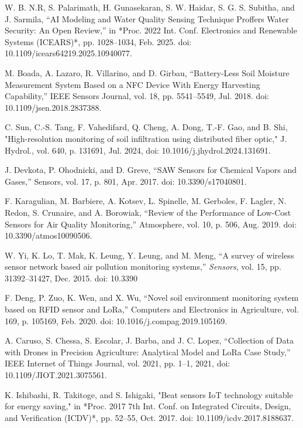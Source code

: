 \begin{thebibliography}{00}
 W. B. N.R, S. Palarimath, H. Gunasekaran, S. W. Haidar, S. G. S. Subitha, and J. Sarmila, 
``AI Modeling and Water Quality Sensing Technique Proffers Water Security: An Open Review,'' 
in *Proc. 2022 Int. Conf. Electronics and Renewable Systems (ICEARS)*, pp. 1028--1034, Feb. 2025. doi: 10.1109/icears64219.2025.10940077.

 M. Boada, A. Lazaro, R. Villarino, and D. Girbau, 
``Battery-Less Soil Moisture Measurement System Based on a NFC Device With Energy Harvesting Capability,'' 
IEEE Sensors Journal, vol. 18, pp. 5541--5549, Jul. 2018. 
doi: 10.1109/jsen.2018.2837388.

 C. Sun, C.-S. Tang, F. Vahedifard, Q. Cheng, A. Dong, T.-F. Gao, and B. Shi, "High-resolution monitoring of soil infiltration using distributed fiber optic," J. Hydrol., vol. 640, p. 131691, Jul. 2024, doi: 10.1016/j.jhydrol.2024.131691.

 J. Devkota, P. Ohodnicki, and D. Greve, 
``SAW Sensors for Chemical Vapors and Gases,'' 
Sensors, vol. 17, p. 801, Apr. 2017. 
doi: 10.3390/s17040801.

 F. Karagulian, M. Barbiere, A. Kotsev, L. Spinelle, M. Gerboles, F. Lagler, N. Redon, S. Crunaire, and A. Borowiak, 
``Review of the Performance of Low-Cost Sensors for Air Quality Monitoring,'' 
Atmosphere, vol. 10, p. 506, Aug. 2019. doi: 10.3390/atmos10090506.

 W. Yi, K. Lo, T. Mak, K. Leung, Y. Leung, and M. Meng, ``A survey of wireless sensor network based air pollution monitoring systems,'' \emph{Sensors}, vol. 15, pp. 31392--31427, Dec. 2015. doi: 10.3390

 F. Deng, P. Zuo, K. Wen, and X. Wu, 
``Novel soil environment monitoring system based on RFID sensor and LoRa,'' 
Computers and Electronics in Agriculture, vol. 169, p. 105169, Feb. 2020. doi: 10.1016/j.compag.2019.105169.

 A. Caruso, S. Chessa, S. Escolar, J. Barba, and J. C. Lopez, “Collection of Data with Drones in Precision Agriculture: Analytical Model and LoRa Case Study,” IEEE Internet of Things Journal, vol. 2021, pp. 1–1, 2021, doi: 10.1109/JIOT.2021.3075561.

K. Ishibashi, R. Takitoge, and S. Ishigaki, 
"Beat sensors IoT technology suitable for energy saving," 
in *Proc. 2017 7th Int. Conf. on Integrated Circuits, Design, and Verification (ICDV)*, pp. 52--55, Oct. 2017. doi: 10.1109/icdv.2017.8188637.


\end{thebibliography}
